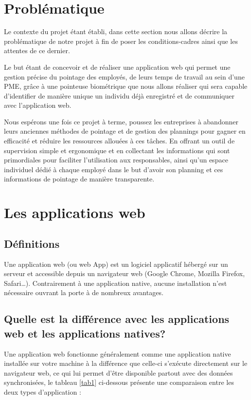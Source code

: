 \section{Problématique}
Le contexte du projet étant établi, dans cette section nous allons décrire la problématique de notre projet à fin de poser les conditions-cadres ainsi que les attentes de ce dernier.

Le but étant de concevoir et de réaliser une application web qui permet une gestion précise du pointage des employés, de leurs temps de travail au sein d’une PME, grâce à une pointeuse biométrique que nous allons réaliser qui sera capable d’identifier de manière unique un individu déjà enregistré et de communiquer avec l’application web.

Nous espérons une fois ce projet à terme, poussez les entreprises à abandonner leurs anciennes méthodes de pointage et de gestion des plannings pour gagner en efficacité et réduire les ressources allouées à ces tâches. En offrant un outil de supervision simple et ergonomique et en collectant les informations qui sont primordiales pour faciliter l’utilisation aux responsables, ainsi qu’un espace individuel dédié à chaque employé dans le but d’avoir son planning et ces informations de pointage de manière transparente.


\section{Les applications web}
    \subsection{Définitions}
        Une application web (ou web App) est un logiciel applicatif hébergé sur un serveur et accessible depuis un navigateur web (Google Chrome, Mozilla Firefox, Safari…). Contrairement à une application native, aucune installation n’est nécessaire ouvrant la porte à de nombreux avantages.
        
    \subsection{Quelle est la différence avec les applications web et les applications natives?}
        Une application web fonctionne généralement comme une application native installée sur votre machine à la différence que celle-ci s’exécute directement sur le navigateur web, ce qui lui permet d’être disponible partout avec des données synchronisées, le tableau \ref{tab1}  ci-dessous présente une comparaison entre les deux types d’application \cite{1} :
        
